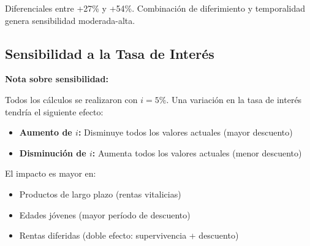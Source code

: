 Diferenciales entre +27\% y +54\%. Combinación de diferimiento y temporalidad genera sensibilidad moderada-alta.




\subsection{Sensibilidad a la Tasa de Interés}

\begin{hallazgobox}
\textbf{Nota sobre sensibilidad:}

Todos los cálculos se realizaron con $i = 5\%$. Una variación en la tasa de interés tendría el siguiente efecto:

\begin{itemize}
    \item \textbf{Aumento de $i$:} Disminuye todos los valores actuales (mayor descuento)
    \item \textbf{Disminución de $i$:} Aumenta todos los valores actuales (menor descuento)
\end{itemize}

El impacto es mayor en:
\begin{itemize}
    \item Productos de largo plazo (rentas vitalicias)
    \item Edades jóvenes (mayor período de descuento)
    \item Rentas diferidas (doble efecto: supervivencia + descuento)
\end{itemize}
\end{hallazgobox}
